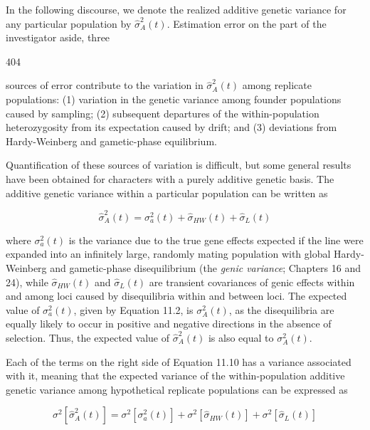 \documentclass{article}
\begin{document}
In the following discourse, we denote the realized additive genetic variance for any particular population by  $ \widehat{\sigma}_{A}^{2}(t) $. Estimation error on the part of the investigator aside, three

404

sources of error contribute to the variation in  $ \widehat{\sigma}_{A}^{2}(t) $ among replicate populations: (1) variation in the genetic variance among founder populations caused by sampling; (2) subsequent departures of the within-population heterozygosity from its expectation caused by drift; and (3) deviations from Hardy-Weinberg and gametic-phase equilibrium.

Quantification of these sources of variation is difficult, but some general results have been obtained for characters with a purely additive genetic basis. The additive genetic variance within a particular population can be written as

\begin{equation}
\widehat{\sigma}_{A}^{2}(t)=\sigma_{a}^{2}(t)+\widehat{\sigma}_{H W}(t)+\widehat{\sigma}_{L}(t)
\tag{11.10}
\label{eq:11_10}
\end{equation}

where  $ \sigma_a^2(t) $ is the variance due to the true gene effects expected if the line were expanded into an infinitely large, randomly mating population with global Hardy-Weinberg and gametic-phase disequilibrium (the \textit{genic variance}; Chapters 16 and 24), while  $ \widehat{\sigma}_{HW}(t) $ and  $ \widehat{\sigma}_L(t) $ are transient covariances of genic effects within and among loci caused by disequilibria within and between loci. The expected value of  $ \sigma_a^2(t) $, given by Equation 11.2, is  $ \sigma_A^2(t) $, as the disequilibria are equally likely to occur in positive and negative directions in the absence of selection. Thus, the expected value of  $ \widehat{\sigma}_A^2(t) $ is also equal to  $ \sigma_A^2(t) $.

Each of the terms on the right side of Equation 11.10 has a variance associated with it, meaning that the expected variance of the within-population additive genetic variance among hypothetical replicate populations can be expressed as

\begin{equation}
\sigma^{2}\left[\widehat{\sigma}_{A}^{2}(t)\right]=\sigma^{2}\left[\sigma_{a}^{2}(t)\right]+\sigma^{2}\left[\widehat{\sigma}_{H W}(t)\right]+\sigma^{2}\left[\widehat{\sigma}_{L}(t)\right]
\tag{11.11}
\label{eq:11_11}
\end{equation}
\end{document}
